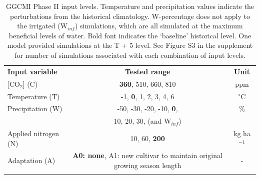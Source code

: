 \documentclass[gmd, manuscript]{copernicus} %
\begin{document}
\begin{table}[t]
\caption{GGCMI Phase II input levels. Temperature and precipitation values indicate the perturbations from the historical climatology. W-percentage does not apply to the irrigated (W$_{inf}$) simulations, which are all simulated at the maximum beneficial levels of water. Bold font indicates the `baseline' historical level. One model provided simulations at the T + 5 level. See Figure S3 in the supplement for number of simulations associated with each combination of input levels.}
\label{table:inputs} 
    \begin{tabular}{lcc} 
        \tophline \vspace{1mm}
        \textbf{Input variable} & \textbf{Tested range} & \textbf{Unit} \\ \middlehline \vspace{1mm}
        [CO$_2$] (C) & \textbf{360}, 510, 660, 810 & ppm\\ \middlehline \vspace{1mm}
        Temperature (T) & -1, \textbf{0}, 1, 2, 3, 4, 6 & $^{\circ}$C\\ \middlehline \vspace{1mm}
        Precipitation (W) & -50, -30, -20, -10, \textbf{0}, & \% \\
        {} & 10, 20, 30, (and W$_{inf}$) & {} \\ \middlehline \vspace{1mm}
        Applied nitrogen (N) & 10, 60, \textbf{200} & kg ha$^{-1}$ \\ \middlehline \vspace{1mm}
        Adaptation (A) & \textbf{A0: none}, A1: new cultivar to maintain original growing season length & -\\ \bottomhline
    \end{tabular}\\
\end{table}
\end{document}
